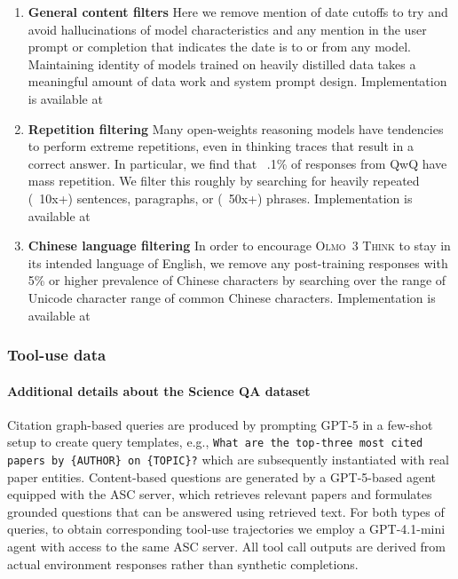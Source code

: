 \documentclass[table]{ai2style/ai2}
\newcommand{\olmothreethinking}{\textsc{Olmo~3 Think}\xspace}
\begin{document}
{{\begin{enumerate}
\item {\bf General content filters}
Here we remove mention of date cutoffs to try and avoid hallucinations of model characteristics and any mention in the user prompt or completion that indicates the date is to or from any model.
Maintaining identity of models trained on heavily distilled data takes a meaningful amount of data work and system prompt design.
Implementation is available at  \href{https://github.com/allenai/open-instruct/blob/7ba4cd0/scripts/data/filtering_and_updates/filter_datasets_sequential.sh}{}

\item {\bf Repetition filtering}
Many open-weights reasoning models have tendencies to perform extreme repetitions, even in thinking traces that result in a correct answer.
In particular, we find that ~.1\% of responses from QwQ have mass repetition.
We filter this roughly by searching for heavily repeated (~10x+) sentences, paragraphs, or (~50x+) phrases.
Implementation is available at \href{https://github.com/allenai/open-instruct/blob/7ba4cd0/scripts/data/filtering_and_updates/filter_ngram_repetitions.py}{}

\item {\bf Chinese language filtering}
In order to encourage \olmothreethinking to stay in its intended language of English, we remove any post-training responses with 5\% or higher prevalence of Chinese characters by searching over the range of Unicode character range of common Chinese characters.
Implementation is available at \href{https://github.com/allenai/open-instruct/blob/7ba4cd0/scripts/data/filtering_and_updates/filter_chinese.py}{}

\end{enumerate}
\subsubsection{Tool-use data} \label{sec:appendix_tool_use_data}
\paragraph{Additional details about the Science QA dataset} Citation graph-based queries are produced by prompting GPT-5 in a few-shot setup to create query templates, e.g., \texttt{What are the top-three most cited papers by \{AUTHOR\} on \{TOPIC\}?} which are subsequently instantiated with real paper entities. Content-based questions are generated by a GPT-5-based agent equipped with the ASC server, which retrieves relevant papers and formulates grounded questions that can be answered using retrieved text. For both types of queries, to obtain corresponding tool-use trajectories we employ a GPT-4.1-mini agent with access to the same ASC server. All tool call outputs are derived from actual environment responses rather than synthetic completions.

}}
\end{document}

